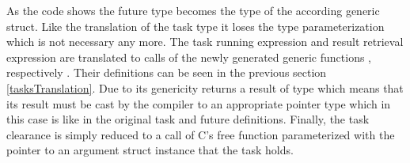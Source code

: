 As the code shows the future type becomes the type of the according generic  struct. Like the translation of the task type it loses the type parameterization  which is not necessary any more. The task running expression  and result retrieval expression  are translated to calls of the newly generated generic functions , respectively . Their definitions can be seen in the previous section \ref{tasksTranslation}. Due to its genericity  returns a result of type  which means that its result must be cast by the compiler to an appropriate pointer type which in this case is  like in the original task and future definitions. Finally, the task clearance is simply reduced to a call of C's free function parameterized with the pointer to an argument struct instance that the task holds.